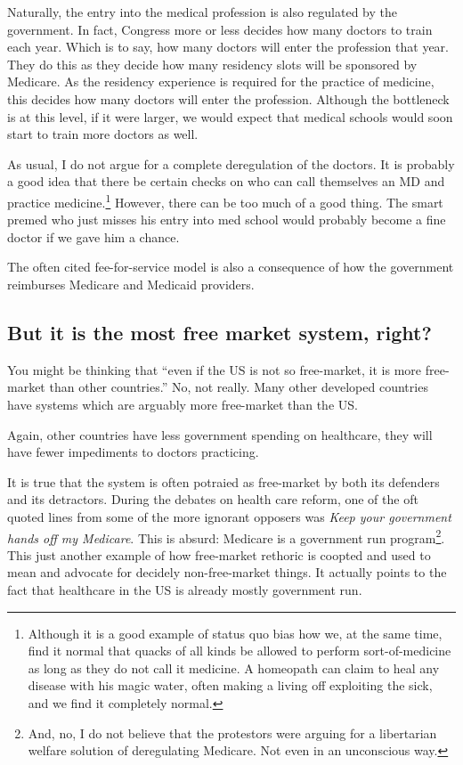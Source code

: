 Naturally, the entry into the medical profession is also regulated by the
government. In fact, Congress more or less decides how many doctors to train
each year. Which is to say, how many doctors will enter the profession that
year. They do this as they decide how many residency slots will be sponsored by
Medicare. As the residency experience is required for the practice of medicine,
this decides how many doctors will enter the profession. Although the
bottleneck is at this level, if it were larger, we would expect that medical
schools would soon start to train more doctors as well.

As usual, I do not argue for a complete deregulation of the doctors. It is
probably a good idea that there be certain checks on who can call themselves an
MD and practice medicine.\footnote{Although it is a good example of status quo
bias how we, at the same time, find it normal that quacks of all kinds be
allowed to perform sort-of-medicine as long as they do not call it medicine. A
homeopath can claim to heal any disease with his magic water, often making a
living off exploiting the sick, and we find it completely normal.} However,
there can be too much of a good thing. The smart premed who just misses his
entry into med school would probably become a fine doctor if we gave him a
chance.

The often cited fee-for-service model is also a consequence of how the
government reimburses Medicare and Medicaid providers.

\subsection{But it is the most free market system, right?}

You might be thinking that ``even if the US is not so free-market, it is more
free-market than other countries.'' No, not really. Many other developed
countries have systems which are arguably more free-market than the US.

Again, other countries have less government spending on healthcare, they will
have fewer impediments to doctors practicing.

It is true that the system is often potraied as free-market by both its
defenders and its detractors. During the debates on health care reform, one of
the oft quoted lines from some of the more ignorant opposers was \emph{Keep
your government hands off my Medicare}. This is absurd: Medicare is a
government run program\footnote{And, no, I do not believe that the protestors
were arguing for a libertarian welfare solution of deregulating Medicare. Not
even in an unconscious way.}. This just another example of how free-market
rethoric is coopted and used to mean and advocate for decidely non-free-market
things. It actually points to the fact that healthcare in the US is already
mostly government run.

